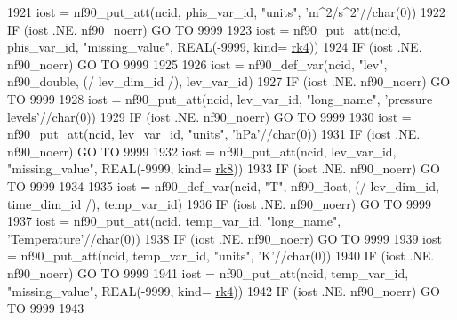 \begin{DoxyCode}
1921     iost    = nf90\_put\_att(ncid, phis\_var\_id, \textcolor{stringliteral}{"units"}, \textcolor{stringliteral}{'m^2/s^2'}//char(0))
1922     \textcolor{keywordflow}{IF} (iost .NE. nf90\_noerr) \textcolor{keywordflow}{GO TO} 9999
1923     iost    = nf90\_put\_att(ncid, phis\_var\_id, \textcolor{stringliteral}{"missing\_value"}, \textcolor{keywordtype}{REAL}(-9999, kind=
      \hyperlink{namespaceportable_abaed22a509442771d3fba69bebda0b33}{rk4}))
1924     \textcolor{keywordflow}{IF} (iost .NE. nf90\_noerr) \textcolor{keywordflow}{GO TO} 9999
1925 
1926     iost    = nf90\_def\_var(ncid, \textcolor{stringliteral}{"lev"}, nf90\_double, (/ lev\_dim\_id /), lev\_var\_id)
1927     \textcolor{keywordflow}{IF} (iost .NE. nf90\_noerr) \textcolor{keywordflow}{GO TO} 9999
1928     iost    = nf90\_put\_att(ncid, lev\_var\_id, \textcolor{stringliteral}{"long\_name"}, \textcolor{stringliteral}{'pressure levels'}//char(0))
1929     \textcolor{keywordflow}{IF} (iost .NE. nf90\_noerr) \textcolor{keywordflow}{GO TO} 9999
1930     iost    = nf90\_put\_att(ncid, lev\_var\_id, \textcolor{stringliteral}{"units"}, \textcolor{stringliteral}{'hPa'}//char(0))
1931     \textcolor{keywordflow}{IF} (iost .NE. nf90\_noerr) \textcolor{keywordflow}{GO TO} 9999
1932     iost    = nf90\_put\_att(ncid, lev\_var\_id, \textcolor{stringliteral}{"missing\_value"}, \textcolor{keywordtype}{REAL}(-9999, kind=
      \hyperlink{namespaceportable_a609d4b38b4f128b310e288b1861ad9bd}{rk8}))
1933     \textcolor{keywordflow}{IF} (iost .NE. nf90\_noerr) \textcolor{keywordflow}{GO TO} 9999
1934 
1935     iost    = nf90\_def\_var(ncid, \textcolor{stringliteral}{"T"}, nf90\_float, (/ lev\_dim\_id, time\_dim\_id /), temp\_var\_id)
1936     \textcolor{keywordflow}{IF} (iost .NE. nf90\_noerr) \textcolor{keywordflow}{GO TO} 9999
1937     iost    = nf90\_put\_att(ncid, temp\_var\_id, \textcolor{stringliteral}{"long\_name"}, \textcolor{stringliteral}{'Temperature'}//char(0))
1938     \textcolor{keywordflow}{IF} (iost .NE. nf90\_noerr) \textcolor{keywordflow}{GO TO} 9999
1939     iost    = nf90\_put\_att(ncid, temp\_var\_id, \textcolor{stringliteral}{"units"}, \textcolor{stringliteral}{'K'}//char(0))
1940     \textcolor{keywordflow}{IF} (iost .NE. nf90\_noerr) \textcolor{keywordflow}{GO TO} 9999
1941     iost    = nf90\_put\_att(ncid, temp\_var\_id, \textcolor{stringliteral}{"missing\_value"}, \textcolor{keywordtype}{REAL}(-9999, kind=
      \hyperlink{namespaceportable_abaed22a509442771d3fba69bebda0b33}{rk4}))
1942     \textcolor{keywordflow}{IF} (iost .NE. nf90\_noerr) \textcolor{keywordflow}{GO TO} 9999
1943 

\end{DoxyCode}
